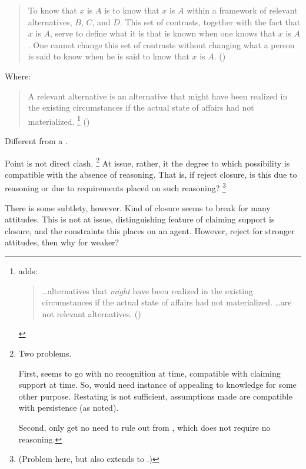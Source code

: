 \begin{note}
  \begin{quote}
    To know that \(x\) is \(A\) is to know that \(x\) is \(A\) within a framework of relevant alternatives, \(B\), \(C\), and \(D\).
    This set of contrasts, together with the fact that \(x\) is \(A\), serve to define what it is that is known when one knows that \(x\) is \(A\).
    One cannot change this set of contrasts without changing what a person is said to know when he is said to know that \(x\) is \(A\).\nolinebreak
    \mbox{}\hfill\mbox{(\citeyear[1022]{Dretske:1970to})}
  \end{quote}

  Where:
  \begin{quote}
    A relevant alternative is an alternative that might have been realized in the existing circumstances if the actual state of affairs had not materialized.\nolinebreak
    \footnote{
      \citeauthor{Dretske:1970to} adds:
  \begin{quote}
    \dots alternatives that \emph{might} have been realized in the existing circumstances if the actual state of affairs had not materialized.
    \dots are not relevant alternatives.\nolinebreak
    \mbox{}\hfill\mbox{(\citeyear[fn.6][1021]{Dretske:1970to})}
  \end{quote}
    }
    \nolinebreak
    \mbox{}\hfill\mbox{(\citeyear[1021]{Dretske:1970to})}
  \end{quote}
  Different from a \requ{}.
\end{note}

\begin{note}
  Point is not direct clash.\nolinebreak
  \footnote{Two problems.

    First, \citeauthor{Dretske:1970to} seems to go with no recognition at time, compatible with claiming support at time.
    So, would need instance of appealing to knowledge for some other purpose.
    Restating is not sufficient, assumptions made are compatible with persistence (as noted).

    Second, only get no need to rule out from \citeauthor{Dretske:1970to}, which does not require no reasoning.
  }
  At issue, rather, it the degree to which possibility is compatible with the absence of reasoning.
  That is, if reject closure, is this due to reasoning or due to requirements placed on such reasoning?\nolinebreak
  \footnote{
    (Problem here, but also extends to \nI{}.)
  }

  There is some subtlety, however.
  Kind of closure seems to break for many attitudes.
  This is not at issue, distinguishing feature of claiming support is closure, and the constraints this places on an agent.
  However, reject for stronger attitudes, then why for weaker?
\end{note}

